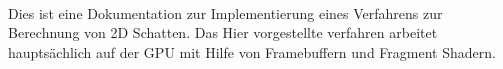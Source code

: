 \kurzfassung

\paragraph*{}
Dies ist eine Dokumentation zur Implementierung eines Verfahrens zur Berechnung von 2D Schatten. 
Das Hier vorgestellte verfahren arbeitet hauptsächlich auf der GPU
mit Hilfe von Framebuffern und Fragment Shadern.
